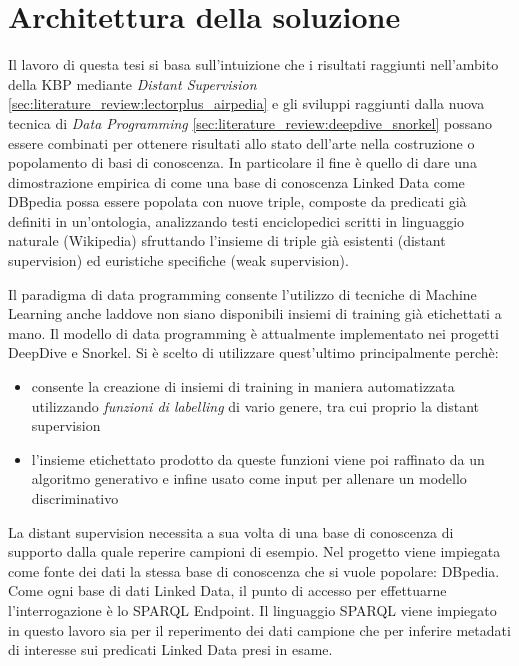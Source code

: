 %
\chapter{Architettura della soluzione}
\label{sec:methods}

Il lavoro di questa tesi si basa sull'intuizione che i risultati raggiunti nell'ambito della KBP mediante \textit{Distant Supervision}  \ref{sec:literature_review:lectorplus_airpedia} \cite{Mintz2009DistantSF,Exner2012EntityEF,Aprosio2013ExtendingTC,Soderland2013OpenIE,Cannaviccio2016AccurateFH} e gli sviluppi raggiunti dalla nuova tecnica di \textit{Data Programming} \ref{sec:literature_review:deepdive_snorkel} \cite{Ratner2016DataPC,Ehrenberg2016DataPW,Bach2017LearningTS,WEB:weak_supervision} possano essere combinati per ottenere risultati allo stato dell'arte nella costruzione o popolamento di basi di conoscenza. 
In particolare il fine è quello di dare una dimostrazione empirica di come una base di conoscenza Linked Data come DBpedia possa essere popolata con nuove triple, composte da predicati già definiti in un'ontologia, analizzando testi enciclopedici scritti in linguaggio naturale (Wikipedia) sfruttando l'insieme di triple già esistenti (distant supervision) ed euristiche specifiche (weak supervision).

Il paradigma di data programming consente l'utilizzo di tecniche di Machine Learning anche laddove non siano disponibili insiemi di training già etichettati a mano. 
Il modello di data programming è attualmente implementato nei progetti DeepDive e Snorkel.
Si è scelto di utilizzare quest'ultimo principalmente perchè:
\begin{itemize}
\item consente la creazione di insiemi di training in maniera automatizzata utilizzando \textit{funzioni di labelling} di vario genere, tra cui proprio la distant supervision
\item l'insieme etichettato prodotto da queste funzioni viene poi raffinato da un algoritmo generativo e infine usato come input per allenare un modello discriminativo
\end{itemize}


La distant supervision necessita a sua volta di una base di conoscenza di supporto dalla quale reperire campioni di esempio. Nel progetto viene impiegata come fonte dei dati la stessa base di conoscenza che si vuole popolare: DBpedia. Come ogni base di dati Linked Data, il punto di accesso per effettuarne l'interrogazione è lo SPARQL Endpoint. Il linguaggio SPARQL viene impiegato in questo lavoro sia per il reperimento dei dati campione che per inferire metadati di interesse sui predicati Linked Data presi in esame.

